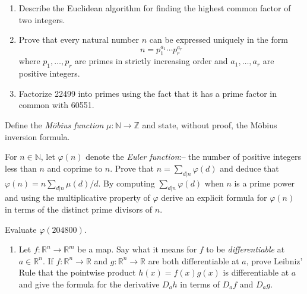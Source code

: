 \documentclass{exams}
\newcommand{\R}{\mathbb{R}}
\newcommand{\N}{\mathbb{N}}
\newcommand{\Z}{\mathbb{Z}}
\begin{document}

%
\begin{examcomp1}

\begin{question}
\begin{enumerate}
\item Describe the Euclidean algorithm for finding the
highest common factor of two integers.

\item Prove that every natural number $n$ can be expressed
uniquely in the form
$$
n=p_1^{a_1}\cdots p_r^{a_r}
$$
where $p_1,\ldots,p_r$ are primes in strictly increasing order
and $a_1,\ldots,a_r$ are positive integers.

\item Factorize 22499 into primes using the fact that it has a
prime factor in common with 60551.
\end{enumerate}
\end{question}

\newpage

\begin{question}
Define the {\it M\"obius function} $\mu \colon \N \to \Z$
and state, without proof, the M\"obius inversion formula.

For $n \in \N$, let $\varphi(n)$ denote the {\it Euler
function}:-- the number of positive integers less than $n$ and coprime
to $n$. Prove that $n= \displaystyle{\sum_{d\vert n}} \varphi(d)$ and
deduce that $\varphi(n) = n\displaystyle{\sum_{d\vert n}} \mu(d)/d$.
By computing $\displaystyle{\sum_{d\vert n}} \varphi(d)$ when $n$ is a
prime power and using the multiplicative property of $\varphi$ derive
an explicit formula for $\varphi(n)$ in terms of the distinct prime
divisors of $n$.

Evaluate $\varphi(204800)$.
\end{question}


\begin{question}
\begin{enumerate}
\item Let $f \colon \R^n \to \R^m$ be a map. Say what it means for $f$ to be
\textit{differentiable} at $a \in \R^n$. If $f \colon \R^n \to \R$ and
$g \colon \R^n \to \R$ are both differentiable at $a$, prove Leibniz'
Rule that the pointwise product $h(x) = f(x)g(x)$ is differentiable at
$a$ and give the formula for the derivative $D_ah$ in terms of $D_af$
and $D_ag$.


\end{enumerate}
\end{question}
\end{examcomp1}
\end{document}

